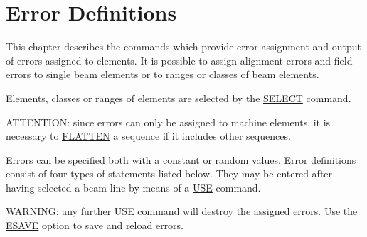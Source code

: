 
\chapter{Error Definitions}  
This chapter describes the commands which provide error assignment and
output of errors assigned to elements. It is possible to assign
alignment errors and field errors to single beam elements or to ranges
or classes of beam elements.  

Elements, classes or ranges of elements are selected by the
\href{../Introduction/select.html}{SELECT} command.  

ATTENTION: since errors can only be assigned to machine elements, it is
necessary to  \href{../control/seqedit.html#flatten}{FLATTEN} a sequence
if it includes other sequences.  

Errors can be specified both with a constant or random values. Error
definitions consist of four types of statements listed below. They may
be entered after having selected a beam line by means of a
\href{../control/general.html#use}{USE} command.  

WARNING: any further \href{../control/general.html#use}{USE} command
will destroy the assigned errors. Use the
\href{../error/error_save.html}{ESAVE} option to save and reload errors.  









